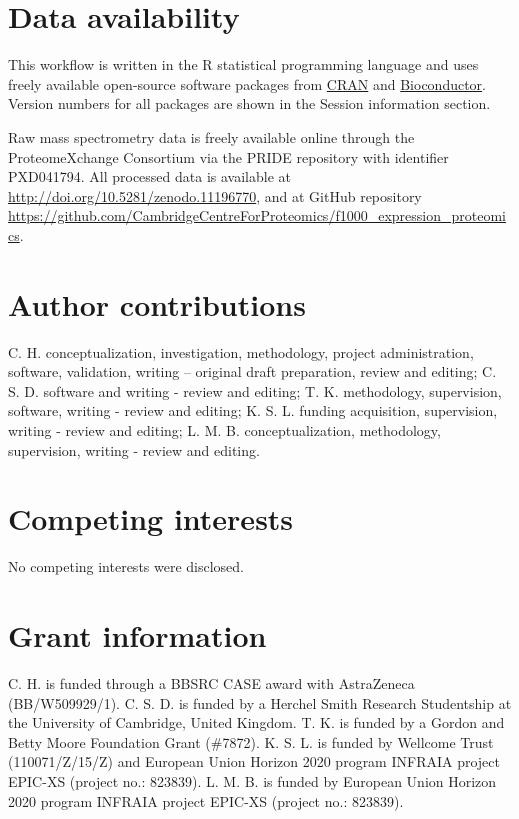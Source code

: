 \documentclass[9pt,a4paper,]{extarticle}
\begin{document}
\section{Data availability}\label{data-availability}

This workflow is written in the R statistical programming language and uses
freely available open-source software packages from \href{https://cran.r-project.org}{CRAN}
and \href{https://bioconductor.org}{Bioconductor}. Version numbers for all packages
are shown in the Session information section.

Raw mass spectrometry data is freely available online through the
ProteomeXchange Consortium via the PRIDE repository with identifier PXD041794.
All processed data is available at
\url{http://doi.org/10.5281/zenodo.11196770},
and at GitHub repository \url{https://github.com/CambridgeCentreForProteomics/f1000_expression_proteomics}.

\section{Author contributions}\label{author-contributions}

C. H. conceptualization, investigation, methodology, project administration,
software, validation, writing -- original draft preparation, review and editing;
C. S. D. software and writing - review and editing; T. K. methodology,
supervision, software, writing - review and editing; K. S. L. funding acquisition,
supervision, writing - review and editing; L. M. B. conceptualization, methodology,
supervision, writing - review and editing.

\section{Competing interests}\label{competing-interests}

No competing interests were disclosed.

\section{Grant information}\label{grant-information}

C. H. is funded through a BBSRC CASE award with AstraZeneca (BB/W509929/1). C. S.
D. is funded by a Herchel Smith Research Studentship at the University of
Cambridge, United Kingdom. T. K. is funded by a Gordon and Betty Moore Foundation
Grant (\#7872). K. S. L. is funded by Wellcome Trust (110071/Z/15/Z) and European
Union Horizon 2020 program INFRAIA project EPIC-XS (project no.: 823839). L. M.
B. is funded by European Union Horizon 2020 program INFRAIA project EPIC-XS
(project no.: 823839).
\end{document}
